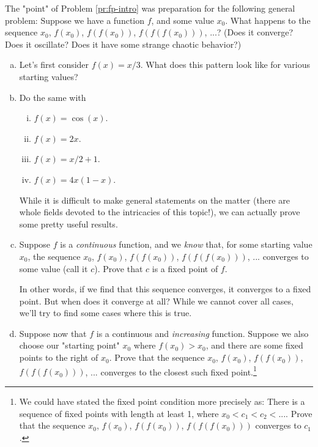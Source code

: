 \begin{problem}
\label{pr:fp-iter}


The "point" of Problem \ref{pr:fp-intro} was preparation for the following general problem: Suppose we have a function $f$, and some value $x_0$. What happens to the sequence $x_0$, $f(x_0)$, $f(f(x_0))$, $f(f(f(x_0)))$, ...? (Does it converge? Does it oscillate? Does it have some strange chaotic behavior?)

\begin{enumerate}[(a)]
\item Let's first consider $f(x) = x/3$. What does this pattern look like for various starting values?
\item Do the same with 
\begin{enumerate}[i.]
\item $f(x) = \cos(x)$.
\item $f(x) = 2x$. 
\item $f(x) = x/2 + 1$. 
\item $f(x) = 4x(1-x)$. %
\end{enumerate} \hfill

While it is difficult to make general statements on the matter (there are whole fields devoted to the intricacies of this topic!), we can actually prove some pretty useful results.


\item Suppose $f$ is a \emph{continuous} function, and we \emph{know} that, for some starting value $x_0$, the sequence $x_0$, $f(x_0)$, $f(f(x_0))$, $f(f(f(x_0)))$, ... converges to some value (call it $c$). Prove that $c$ is a fixed point of $f$.

In other words, if we find that this sequence converges, it converges to a fixed point. But when does it converge at all? While we cannot cover all cases, we'll try to find some cases where this is true.


\item Suppose now that $f$ is a continuous and \emph{increasing} function. Suppose we also choose our "starting point" $x_0$ where $f(x_0) > x_0$, and there are some fixed points to the right of $x_0$. Prove that the sequence $x_0$, $f(x_0)$, $f(f(x_0))$, $f(f(f(x_0)))$, ... converges to the closest such fixed point.\footnote{We could have stated the fixed point condition more precisely as: There is a sequence of fixed points with length at least 1, where $x_0 < c_1 < c_2 < ...$. Prove that the sequence $x_0$, $f(x_0)$, $f(f(x_0))$, $f(f(f(x_0)))$ converges to $c_1$.}


\end{enumerate}
\end{problem}
